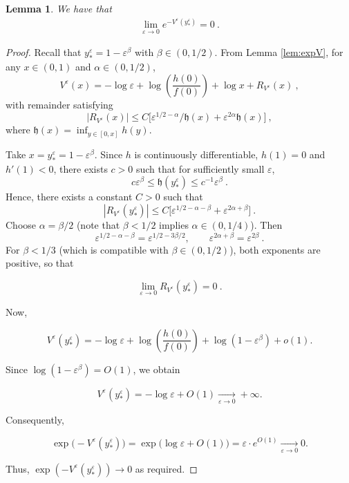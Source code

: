 \documentclass[reqno, 12pt, a4paper]{amsart}
\theoremstyle{plain}
\newtheorem{lemma}[theorem]{Lemma}
\theoremstyle{definition}
\begin{document}
\begin{lemma}
\label{lem:Vyepsilonstar}
We have that 
\begin{equation}
\begin{split}
\lim_{\varepsilon \to 0} e^{-V^\varepsilon (y_*^\varepsilon)} = 0 \ .
\end{split}
\end{equation}
\end{lemma}

\begin{proof}
Recall that \(y_*^\varepsilon = 1 - \varepsilon^\beta\) with \(\beta \in (0,1/2)\).  From Lemma \ref{lem:expV}, for any \(x \in (0,1)\) and \(\alpha \in (0,1/2)\),
\[
V^\varepsilon(x) = -\log \varepsilon + \log\left(\frac{h(0)}{f(0)}\right) + \log x + R_{V^\varepsilon}(x) \ ,
\]
with remainder satisfying
\[
|R_{V^\varepsilon}(x)| \leq C\bigl[\varepsilon^{1/2-\alpha}/\mathfrak{h}(x) + \varepsilon^{2\alpha}\mathfrak{h}(x)\bigr] \ ,
\]
where \(\mathfrak{h}(x) = \inf_{y\in[0,x]} h(y)\).

\bigskip

Take \(x = y_*^\varepsilon = 1 - \varepsilon^\beta\).   Since \(h\) is continuously differentiable, \(h(1)=0\) and $h'(1)<0$, there exists \(c>0\) such that for sufficiently small \(\varepsilon\),
\[
c \varepsilon^\beta \le \mathfrak{h}(y_*^\varepsilon) \le c^{-1} \varepsilon^\beta \ .
\]
Hence, there exists a constant $C>0$ such that
\[
|R_{V^\varepsilon}(y_*^\varepsilon)| \leq C\bigl[\varepsilon^{1/2-\alpha - \beta} + \varepsilon^{2\alpha+\beta}\bigr] \ .
\]
Choose \(\alpha = \beta/2\) (note that \(\beta<1/2\) implies \(\alpha\in(0,1/4)\)). Then
\[
\varepsilon^{1/2-\alpha-\beta} = \varepsilon^{1/2 - 3\beta/2}, \qquad \varepsilon^{2\alpha+\beta} = \varepsilon^{2\beta} \ .
\]
For \(\beta < 1/3\) (which is compatible with \(\beta\in(0,1/2)\)), both exponents are positive, so that 

\[
\lim_{\varepsilon \to 0} R_{V^\varepsilon}(y_*^\varepsilon) =0 \ .
\]

\bigskip

Now,

\[
V^\varepsilon(y_*^\varepsilon) = -\log \varepsilon + \log\left(\frac{h(0)}{f(0)}\right) + \log(1-\varepsilon^\beta) + o(1).
\]

Since \(\log(1-\varepsilon^\beta) = O(1)\), we obtain

\[
V^\varepsilon(y_*^\varepsilon) = -\log \varepsilon + O(1) \xrightarrow[\varepsilon\to0]{} +\infty.
\]

\bigskip

Consequently,

\[
\exp\bigl(-V^\varepsilon(y_*^\varepsilon)\bigr) = \exp\bigl(\log\varepsilon + O(1)\bigr) = \varepsilon \cdot e^{O(1)} \xrightarrow[\varepsilon\to0]{} 0.
\]

\bigskip

Thus, \(\exp(-V^\varepsilon(y_*^\varepsilon)) \to 0\) as required.

\end{proof}
\end{document}
